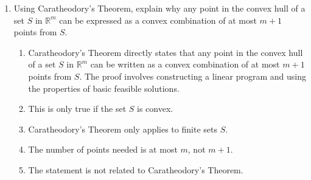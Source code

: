 \documentclass{article}%
\begin{document}
\begin{enumerate}
\begin{enumerate}
\begin{enumerate}
\item The convex hull is not necessarily a convex set.%
\item The concept of "smallest" is not well-defined for sets.%
\end{enumerate}%
\vspace{0.5em}%
\item Using Caratheodory's Theorem, explain why any point in the convex hull of a set $S$ in $\mathbb{R}^m$ can be expressed as a convex combination of at most $m+1$ points from $S$.%
\begin{enumerate}%
\item Caratheodory's Theorem directly states that any point in the convex hull of a set $S$ in $\mathbb{R}^m$ can be written as a convex combination of at most $m+1$ points from $S$. The proof involves constructing a linear program and using the properties of basic feasible solutions.%
\item This is only true if the set $S$ is convex.%
\item Caratheodory's Theorem only applies to finite sets $S$.%
\item The number of points needed is at most $m$, not $m+1$.%
\item The statement is not related to Caratheodory's Theorem.%
\end{enumerate}%
\vspace{0.5em}%
\end{enumerate}%
\end{enumerate}

%
\newpage%
\end{document}
